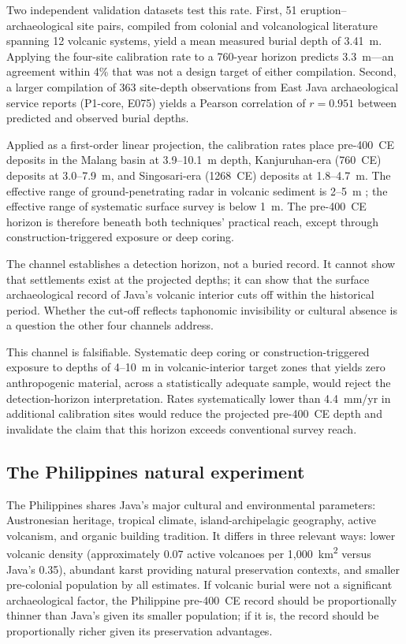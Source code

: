 \documentclass[12pt,a4paper]{article}
\begin{document}
Two independent validation datasets test this rate. First, 51 eruption--archaeological site pairs, compiled from colonial and volcanological literature spanning 12 volcanic systems, yield a mean measured burial depth of 3.41~m. Applying the four-site calibration rate to a 760-year horizon predicts 3.3~m---an agreement within 4\% that was not a design target of either compilation. Second, a larger compilation of 363 site-depth observations from East Java archaeological service reports (P1-core, E075) yields a Pearson correlation of $r=0.951$ between predicted and observed burial depths.

Applied as a first-order linear projection, the calibration rates place pre-400~CE deposits in the Malang basin at 3.9--10.1~m depth, Kanjuruhan-era (760~CE) deposits at 3.0--7.9~m, and Singosari-era (1268~CE) deposits at 1.8--4.7~m. The effective range of ground-penetrating radar in volcanic sediment is 2--5~m \citep{conyers2004,goodman2013}; the effective range of systematic surface survey is below 1~m. The pre-400~CE horizon is therefore beneath both techniques' practical reach, except through construction-triggered exposure or deep coring.

The channel establishes a detection horizon, not a buried record. It cannot show that settlements exist at the projected depths; it can show that the surface archaeological record of Java's volcanic interior cuts off within the historical period. Whether the cut-off reflects taphonomic invisibility or cultural absence is a question the other four channels address.

This channel is falsifiable. Systematic deep coring or construction-triggered exposure to depths of 4--10~m in volcanic-interior target zones that yields zero anthropogenic material, across a statistically adequate sample, would reject the detection-horizon interpretation. Rates systematically lower than 4.4~mm/yr in additional calibration sites would reduce the projected pre-400~CE depth and invalidate the claim that this horizon exceeds conventional survey reach.

\subsection{The Philippines natural experiment}
\label{sec:ch2}

The Philippines shares Java's major cultural and environmental parameters: Austronesian heritage, tropical climate, island-archipelagic geography, active volcanism, and organic building tradition. It differs in three relevant ways: lower volcanic density (approximately 0.07 active volcanoes per 1{,}000~km\textsuperscript{2} versus Java's 0.35), abundant karst providing natural preservation contexts, and smaller pre-colonial population by all estimates. If volcanic burial were not a significant archaeological factor, the Philippine pre-400~CE record should be proportionally thinner than Java's given its smaller population; if it is, the record should be proportionally richer given its preservation advantages.
\end{document}
